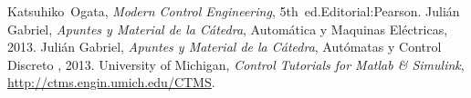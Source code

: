 \documentclass[journal]{IEEEtran}
\begin{document}


\ifCLASSOPTIONcaptionsoff
  \newpage
\fi





%
%
%
\begin{thebibliography}{1}

\bibitem{}
Katsuhiko~Ogata, \emph{Modern Control Engineering}, 5th~ed.\relax Editorial:Pearson.
\bibitem{}
Julián Gabriel, \emph{Apuntes y Material de la Cátedra},
\relax Automática y Maquinas Eléctricas, 2013.
\bibitem{}
Julián Gabriel, \emph{Apuntes y Material de la Cátedra},
\relax Autómatas y Control Discreto , 2013.
\bibitem{}
University of Michigan, \emph{Control Tutorials for Matlab \& Simulink},\\
\relax \url{http://ctms.engin.umich.edu/CTMS}.
\end{thebibliography}

% 
\end{document}

